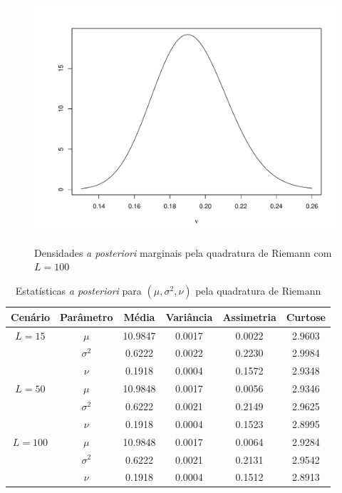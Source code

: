 \documentclass[9pt]{beamer}
\begin{document}
\begin{frame}
\begin{figure}[t]
{{			\label{fig:dpm_nu_qr_100}
			\includegraphics[scale=0.2]{dpm_nu_qr_100.pdf}}}%
	\caption{Densidades \textit{a posteriori} marginais pela quadratura de Riemann com $L = 100$}%
\end{figure}
\end{frame}
\begin{frame}
\begin{table}[htb]
	\caption{Estatísticas \textit{a posteriori} para $(\mu, \sigma^2, \nu)$ pela quadratura de Riemann}
	\label{tab1}
	\centering
	\begin{tabular}{cccccc}
		\toprule
		Cenário & Parâmetro & Média & Variância & Assimetria & Curtose \\
		\midrule
		$L = 15$ & $\mu$      & 10.9847 & 0.0017 & 0.0022 & 2.9603 \\
		& $\sigma^2$ &  0.6222 & 0.0022 & 0.2230 & 2.9984 \\
		& $\nu$      &  0.1918 & 0.0004 & 0.1572 & 2.9348 \\
		\midrule
		$L = 50$ & $\mu$      & 10.9848 & 0.0017 & 0.0056 & 2.9346 \\
		& $\sigma^2$ &  0.6222 & 0.0021 & 0.2149 & 2.9625 \\
		& $\nu$      &  0.1918 & 0.0004 & 0.1523 & 2.8995 \\
		\midrule
		$L = 100$ & $\mu$      & 10.9848 & 0.0017 & 0.0064 & 2.9284 \\
		& $\sigma^2$ &  0.6222 & 0.0021 & 0.2131 & 2.9542 \\
		& $\nu$      &  0.1918 & 0.0004 & 0.1512 & 2.8913 \\
		\bottomrule
	\end{tabular}
\end{table}
\end{frame}
\end{document}
